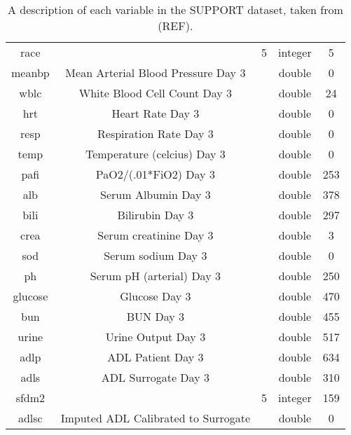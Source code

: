 \documentclass[
]{jss}
\begin{document}
\begin{table}[]
\begin{tabular}{ccccc}
race          &                                          & 5               & integer          & 5            \\
meanbp        & Mean Arterial Blood Pressure Day 3       &                 & double           & 0            \\
wblc          & White Blood Cell Count Day 3             &                 & double           & 24           \\
hrt           & Heart Rate Day 3                         &                 & double           & 0            \\
resp          & Respiration Rate Day 3                   &                 & double           & 0            \\
temp          & Temperature (celcius) Day 3              &                 & double           & 0            \\
pafi          & PaO2/(.01*FiO2) Day 3                    &                 & double           & 253          \\
alb           & Serum Albumin Day 3                      &                 & double           & 378          \\
bili          & Bilirubin Day 3                          &                 & double           & 297          \\
crea          & Serum creatinine Day 3                   &                 & double           & 3            \\
sod           & Serum sodium Day 3                       &                 & double           & 0            \\
ph            & Serum pH (arterial) Day 3                &                 & double           & 250          \\
glucose       & Glucose Day 3                            &                 & double           & 470          \\
bun           & BUN Day 3                                &                 & double           & 455          \\
urine         & Urine Output Day 3                       &                 & double           & 517          \\
adlp          & ADL Patient Day 3                        &                 & double           & 634          \\
adls          & ADL Surrogate Day 3                      &                 & double           & 310          \\
sfdm2         &                                          & 5               & integer          & 159          \\
adlsc         & Imputed ADL Calibrated to Surrogate      &                 & double           & 0           
\end{tabular}
\caption{A description of each variable in the SUPPORT dataset, taken from (REF).}
\label{tab:my-table}
\end{table}
\end{document}
